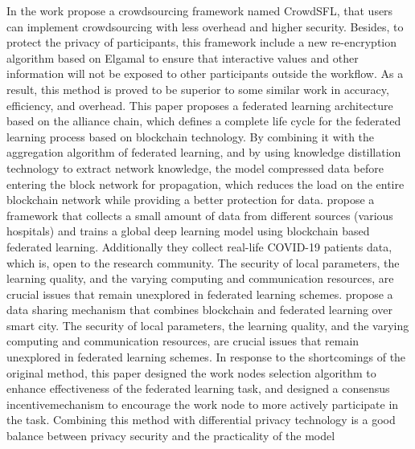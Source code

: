 \documentclass{article}
\begin{document}
\newline \newline In the work \cite{li_crowdsfl_2020} propose a crowdsourcing framework named CrowdSFL, that users can implement crowdsourcing with less overhead and higher security. Besides, to protect the privacy of participants, this framework include a new re-encryption algorithm based on Elgamal to ensure that interactive values and other information will not be exposed to other participants outside the workflow. As a result, this method is proved to be superior to some similar work in accuracy, efficiency, and overhead.
\newline \newline This paper \cite{chen_2020} proposes a federated learning architecture based on the alliance chain, which defines a complete life cycle for the federated learning process based on blockchain technology. By combining it with the aggregation algorithm of federated learning, and by using knowledge distillation technology to extract network knowledge, the model compressed data before entering the block network for propagation, which reduces the load on the entire blockchain network while providing a better protection for data.
\newline \newline \cite{kumar_2021} propose a framework that collects a small amount of data from different sources (various hospitals) and trains a global deep learning model using blockchain based federated learning. Additionally they collect real-life COVID-19 patients data, which is, open to the research community. The security of local parameters, the learning quality, and the varying computing and communication resources, are crucial issues that remain unexplored in federated learning schemes. 
\newline \newline \cite{guo_2020} propose a data sharing mechanism that combines blockchain and federated learning over smart city. The security of local parameters, the learning quality, and the varying computing and communication resources, are crucial issues that remain unexplored in federated learning schemes. In response to the shortcomings of the original method, this paper designed the work nodes selection algorithm to enhance effectiveness of the federated learning task, and designed a consensus incentivemechanism to encourage the work node to more actively participate in the task. Combining this method with diﬀerential privacy technology is a good balance between privacy security and the practicality of the model
\end{document}
